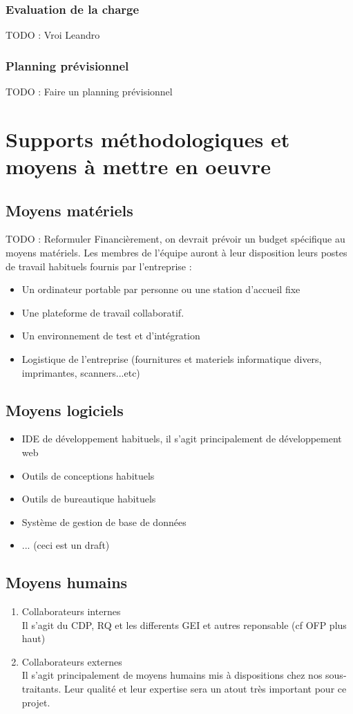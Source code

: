 \subsubsection{Evaluation de la charge}
TODO : Vroi Leandro
\subsubsection{Planning prévisionnel}

TODO : Faire un planning prévisionnel

\section{Supports méthodologiques et moyens à mettre en oeuvre}
\subsection{Moyens matériels}
TODO : Reformuler
Financièrement, on devrait prévoir un budget spécifique au moyens matériels.
Les membres de l'équipe auront à leur disposition leurs postes de travail habituels fournis par l'entreprise :
\begin{itemize}
\item Un ordinateur portable par personne ou une station d'accueil fixe
\item Une plateforme de travail collaboratif.
\item Un environnement de test et d'intégration
\item Logistique de l'entreprise (fournitures et materiels informatique divers, imprimantes, scanners...etc)
\end{itemize}
 
\subsection{Moyens logiciels}
\begin{itemize}
\item IDE de développement habituels, il s'agit principalement de développement web
\item Outils de conceptions habituels
\item Outils de bureautique habituels
\item Système de gestion de base de données
\item ... (ceci est un draft)
\end{itemize}

\subsection{Moyens humains}
\begin{enumerate}
\item Collaborateurs internes\\
Il s'agit du CDP, RQ et les differents GEI et autres reponsable (cf OFP plus haut)

\item Collaborateurs externes\\
Il s'agit principalement de moyens humains mis à dispositions chez nos sous-traitants. Leur qualité et leur expertise sera un atout très
important pour ce projet.
\end{enumerate}
 
